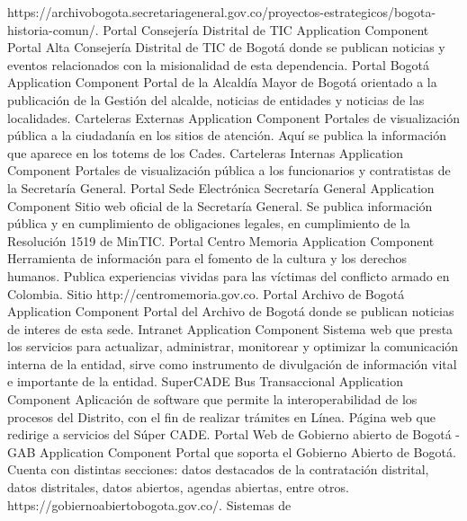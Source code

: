 \documentclass[
	a4paper, %
	12pt, %
]{include/CSSullivanBusinessReport}
\begin{document}
https://archivobogota.secretariageneral.gov.co/proyectos-estrategicos/bogota-historia-comun/.
\textbar{} \textbar{} Portal Consejería Distrital de TIC \textbar{}
Application Component \textbar{} Portal Alta Consejería Distrital de TIC
de Bogotá donde se publican noticias y eventos relacionados con la
misionalidad de esta dependencia. \textbar{} \textbar{} Portal Bogotá
\textbar{} Application Component \textbar{} Portal de la Alcaldía Mayor
de Bogotá orientado a la publicación de la Gestión del alcalde, noticias
de entidades y noticias de las localidades. \textbar{} \textbar{}
Carteleras Externas \textbar{} Application Component \textbar{} Portales
de visualización pública a la ciudadanía en los sitios de atención. Aquí
se publica la información que aparece en los totems de los Cades.
\textbar{} \textbar{} Carteleras Internas \textbar{} Application
Component \textbar{} Portales de visualización pública a los
funcionarios y contratistas de la Secretaría General. \textbar{}
\textbar{} Portal Sede Electrónica Secretaría General \textbar{}
Application Component \textbar{} Sitio web oficial de la Secretaría
General. Se publica información pública y en cumplimiento de
obligaciones legales, en cumplimiento de la Resolución 1519 de MinTIC.
\textbar{} \textbar{} Portal Centro Memoria \textbar{} Application
Component \textbar{} Herramienta de información para el fomento de la
cultura y los derechos humanos. Publica experiencias vividas para las
víctimas del conflicto armado en Colombia. Sitio
http://centromemoria.gov.co. \textbar{} \textbar{} Portal Archivo de
Bogotá \textbar{} Application Component \textbar{} Portal del Archivo de
Bogotá donde se publican noticias de interes de esta sede. \textbar{}
\textbar{} Intranet \textbar{} Application Component \textbar{} Sistema
web que presta los servicios para actualizar, administrar, monitorear y
optimizar la comunicación interna de la entidad, sirve como instrumento
de divulgación de información vital e importante de la entidad.
\textbar{} \textbar{} SuperCADE Bus Transaccional \textbar{} Application
Component \textbar{} Aplicación de software que permite la
interoperabilidad de los procesos del Distrito, con el fin de realizar
trámites en Línea. Página web que redirige a servicios del Súper CADE.
\textbar{} \textbar{} Portal Web de Gobierno abierto de Bogotá - GAB
\textbar{} Application Component \textbar{} Portal que soporta el
Gobierno Abierto de Bogotá. Cuenta con distintas secciones: datos
destacados de la contratación distrital, datos distritales, datos
abiertos, agendas abiertas, entre otros.
https://gobiernoabiertobogota.gov.co/. \textbar{} \textbar{} Sistemas de
\end{document}
